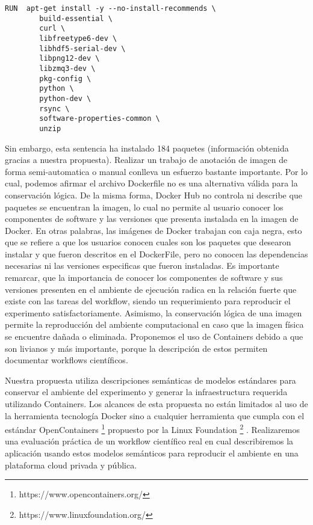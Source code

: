\documentclass{llncs}
\begin{document}
\begin{lstlisting}
RUN  apt-get install -y --no-install-recommends \
        build-essential \
        curl \
        libfreetype6-dev \
        libhdf5-serial-dev \
        libpng12-dev \
        libzmq3-dev \
        pkg-config \
        python \
        python-dev \
        rsync \
        software-properties-common \
        unzip
\end{lstlisting}

Sin embargo, esta sentencia ha instalado 184 paquetes (información obtenida gracias a nuestra propuesta). Realizar un trabajo de anotación de imagen de forma semi-automatica o manual conlleva un esfuerzo bastante importante.
Por lo cual, podemos afirmar el archivo Dockerfile no es una alternativa válida para la conservación lógica.
De la misma forma, Docker Hub no controla ni describe que paquetes se encuentran la imagen, lo cual no permite al usuario conocer los componentes de software y las versiones que presenta instalada en la imagen de Docker. En otras palabras, las imágenes de Docker trabajan con caja negra, esto que se refiere a que los usuarios conocen cuales son los paquetes que desearon instalar y que fueron descritos en el DockerFile, pero no conocen las dependencias necesarias ni las versiones especificas que fueron instaladas.
Es importante remarcar, que la importancia de conocer los componentes de software y sus versiones presenten en el ambiente de ejecución radica en la relación fuerte que existe con las tareas del workflow, siendo un requerimiento para reproducir el experimento satisfactoriamente.
Asimismo, la conservación lógica de una imagen permite la reproducción del ambiente computacional en caso que la imagen física se encuentre dañada o eliminada. Proponemos el uso de Containers debido a que son livianos y más importante, porque la descripción de estos permiten documentar workflows científicos. 

Nuestra propuesta utiliza descripciones semánticas de modelos estándares \cite{santana2017reproducibility} para conservar el ambiente del experimento y generar la infraestructura requerida utilizando Containers. Los alcances de esta propuesta no están limitados al uso de la herramienta tecnología Docker sino a cualquier herramienta que cumpla con el estándar OpenContainers \footnote{https://www.opencontainers.org/} propuesto por la Linux Foundation \footnote{https://www.linuxfoundation.org/}	.
Realizaremos una evaluación práctica de un workflow científico real en cual describiremos la aplicación usando estos modelos semánticos para reproducir el ambiente en una plataforma cloud privada y pública.
\end{document}
